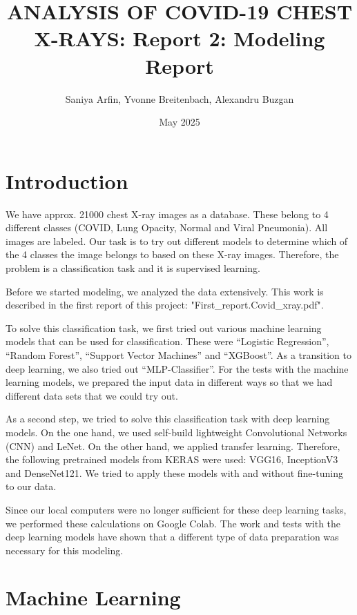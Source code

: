 \documentclass{article}
\title{ANALYSIS OF COVID-19 CHEST X-RAYS: Report 2: Modeling Report}
\author{Saniya Arfin, Yvonne Breitenbach, Alexandru Buzgan}
\date{May 2025}
\begin{document}
\maketitle

\tableofcontents

\newpage 

\section{Introduction}

We have approx. 21000 chest X-ray images as a database. These belong to 4 different classes (COVID, Lung Opacity, Normal and Viral Pneumonia). All images are labeled. Our task is to try out different models to determine which of the 4 classes the image belongs to based on these X-ray images. Therefore, the problem is a classification task and it is supervised learning. 

Before we started modeling, we analyzed the data extensively. This work is described in the first report of this project: "First\_report.Covid\_xray.pdf".

To solve this classification task, we first tried out various machine learning models that can be used for classification. 
These were “Logistic Regression”, “Random Forest”, “Support Vector Machines” and “XGBoost”. As a transition to deep learning, we also tried out “MLP-Classifier”. 
For the tests with the machine learning models, we prepared the input data in different ways so that we had different data sets that we could try out.

As a second step, we tried to solve this classification task with deep learning models. On the one hand, we used self-build lightweight Convolutional Networks (CNN) and LeNet. On the other hand, we applied transfer learning. Therefore, the following pretrained models from KERAS were used: VGG16, InceptionV3 and DenseNet121. We tried to apply these models with and without fine-tuning to our data. 

Since our local computers were no longer sufficient for these deep learning tasks, we performed these calculations on Google Colab. The work and tests with the deep learning models have shown that a different type of data preparation was necessary for this modeling. 

\section{Machine Learning}
\end{document}

